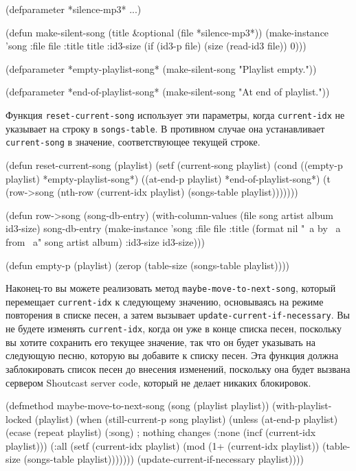 \begin{myverb}
(defparameter *silence-mp3* ...)

(defun make-silent-song (title &optional (file *silence-mp3*))
  (make-instance
   'song 
   :file file
   :title title
   :id3-size (if (id3-p file) (size (read-id3 file)) 0)))

(defparameter *empty-playlist-song* (make-silent-song "Playlist empty."))

(defparameter *end-of-playlist-song* (make-silent-song "At end of playlist."))
\end{myverb}

Функция \lstinline{reset-current-song} использует эти параметры, когда \lstinline{current-idx} не
указывает на строку в \lstinline{songs-table}.  В противном случае она устанавливает
\lstinline{current-song} в значение, соответствующее текущей строке.

\begin{myverb}
(defun reset-current-song (playlist)
  (setf
   (current-song playlist) 
   (cond
     ((empty-p playlist) *empty-playlist-song*)
     ((at-end-p playlist) *end-of-playlist-song*)
     (t (row->song (nth-row (current-idx playlist) (songs-table playlist)))))))

(defun row->song (song-db-entry)
  (with-column-values (file song artist album id3-size) song-db-entry
    (make-instance
     'song
     :file file
     :title (format nil "~a by ~a from ~a" song artist album)
     :id3-size id3-size)))

(defun empty-p (playlist)
  (zerop (table-size (songs-table playlist))))
\end{myverb}

Наконец-то вы можете реализовать метод \lstinline{maybe-move-to-next-song}, который перемещает
\lstinline{current-idx} к следующему значению, основываясь на режиме повторения в списке песен,
а затем вызывает \lstinline{update-current-if-necessary}.  Вы не будете изменять
\lstinline{current-idx}, когда он уже в конце списка песен, поскольку вы хотите сохранить его
текущее значение, так что он будет указывать на следующую песню, которую вы добавите к
списку песен.  Эта функция должна заблокировать список песен до внесения изменений,
поскольку она будет вызвана сервером Shoutcast server code, который не делает никаких
блокировок.

\begin{myverb}
(defmethod maybe-move-to-next-song (song (playlist playlist))
  (with-playlist-locked (playlist)
    (when (still-current-p song playlist)
      (unless (at-end-p playlist)
        (ecase (repeat playlist)
          (:song) ; nothing changes
          (:none (incf (current-idx playlist)))
          (:all  (setf (current-idx playlist)
                       (mod (1+ (current-idx playlist))
                            (table-size (songs-table playlist)))))))
      (update-current-if-necessary playlist))))
\end{myverb}

